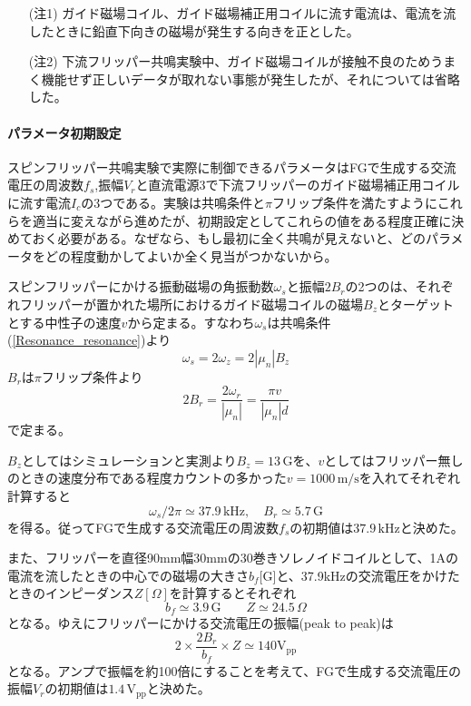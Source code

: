 \begin{itemize}
\item[(注$\!\!$1)] ガイド磁場コイル、ガイド磁場補正用コイルに流す電流は、電流を流したときに鉛直下向きの磁場が発生する向きを正とした。
\item[(注$\!\!$2)] 下流フリッパー共鳴実験中、ガイド磁場コイルが接触不良のためうまく機能せず正しいデータが取れない事態が発生したが、それについては省略した。
\end{itemize}

\newpage
\paragraph{パラメータ初期設定}
スピンフリッパー共鳴実験で実際に制御できるパラメータはFGで生成する交流電圧の周波数$f_s$,振幅$V_r$と直流電源3で下流フリッパーのガイド磁場補正用コイルに流す電流$I_c$の3つである。実験は共鳴条件と$\pi$フリップ条件を満たすようにこれらを適当に変えながら進めたが、初期設定としてこれらの値をある程度正確に決めておく必要がある。なぜなら、もし最初に全く共鳴が見えないと、どのパラメータをどの程度動かしてよいか全く見当がつかないから。

スピンフリッパーにかける振動磁場の角振動数$\omega_s$と振幅$2B_r$の2つのは、それぞれフリッパーが置かれた場所におけるガイド磁場コイルの磁場$B_z$とターゲットとする中性子の速度$v$から定まる。すなわち$\omega_s$は共鳴条件(\ref{Resonance_resonance})より
\begin{equation}
\omega_s = 2\omega_z =2 |\mu_n|B_z
\end{equation}
$B_r$は$\pi$フリップ条件より
\begin{equation}
2B_r =\frac{2 \omega_r}{|\mu_n|} =\frac{\pi v}{|\mu_n|d}
\end{equation}
で定まる。

$B_z$としてはシミュレーションと実測より$B_z=13 \, \mathrm{G}$を、$v$としてはフリッパー無しのときの速度分布である程度カウントの多かった$v=1000\, \mathrm{m/s}$を入れてそれぞれ計算すると
\begin{equation}
\omega_s/2\pi\simeq 37.9\, \mathrm{kHz}, \quad B_r\simeq 5.7 \, \mathrm{G}
\end{equation}
を得る。従ってFGで生成する交流電圧の周波数$f_s$の初期値は$37.9\,\mathrm{kHz}$と決めた。

また、フリッパーを直径90mm幅30mmの30巻きソレノイドコイルとして、1Aの電流を流したときの中心での磁場の大きさ$b_f$[G]と、37.9kHzの交流電圧をかけたときのインピーダンス$Z[\Omega]$を計算するとそれぞれ
\begin{equation}
b_f\simeq 3.9 \,\mathrm{G} \qquad Z \simeq 24.5 \,\Omega
\end{equation}
となる。ゆえにフリッパーにかける交流電圧の振幅(peak to peak)は
\[2 \times \frac{2B_r}{b_f} \times Z \simeq 140 \mathrm{V_{pp}}\]
となる。アンプで振幅を約100倍にすることを考えて、FGで生成する交流電圧の振幅$V_r$の初期値は$1.4 \,\mathrm{V_{pp}}$と決めた。

